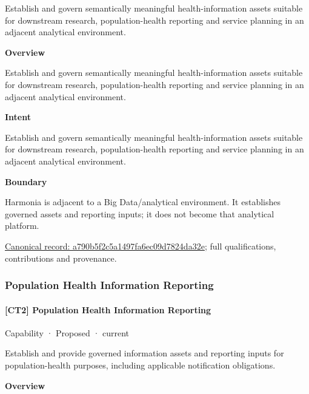 Establish and govern semantically meaningful health-information assets suitable for downstream research, population-health reporting and service planning in an adjacent analytical environment.



\textbf{Overview}



Establish and govern semantically meaningful health-information assets suitable for downstream research, population-health reporting and service planning in an adjacent analytical environment.



\textbf{Intent}



Establish and govern semantically meaningful health-information assets suitable for downstream research, population-health reporting and service planning in an adjacent analytical environment.



\textbf{Boundary}



Harmonia is adjacent to a Big Data/analytical environment. It establishes governed assets and reporting inputs; it does not become that analytical platform.


{\footnotesize \href{../../../../continuum/strategy/capability/a790b5f2c5a1497fa6ec09d7824da32e.md}{Canonical record: a790b5f2c5a1497fa6ec09d7824da32e}; full qualifications, contributions and provenance.}\par
\subsubsection{Population Health Information Reporting}

\paragraph{[CT2] Population Health Information Reporting}

\label{element:2135b45eab034370b0063b20e821985d}
{\small Capability · Proposed · current}\par

Establish and provide governed information assets and reporting inputs for population-health purposes, including applicable notification obligations.



\textbf{Overview}




